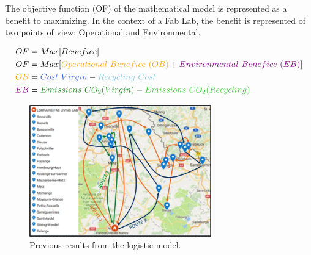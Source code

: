 The objective function (OF) of the mathematical model is represented as a benefit to maximizing. 
In the context of a Fab Lab, the benefit is represented of two points of view: Operational and Environmental. 

\begin{align*} 
OF &= Max[Benefice] \\ 
OF &=  Max[\textcolor{Orange}{Operational~Benefice~(OB)} + \textcolor{Purple}{Environmental~Benefice~(EB) }]  \\
\textcolor{Orange}{OB} &=  \textcolor{RoyalBlue}{Cost~Virgin} - \textcolor{SkyBlue}{Recycling~Cost} \\
\textcolor{Purple}{EB} &= \textcolor{ForestGreen}{Emissions~CO_{2}(Virgin)} - \textcolor{LimeGreen}{Emissions~CO_{2}(Recycling)}
\end{align*}




\begin{figure}[H]
	\centering
		\includegraphics[width=0.7\textwidth]{Figures/Pavlo/Results.png}
		\caption{Previous results from the logistic model.}
		\label{Results.Pavlo}		
\end{figure}

